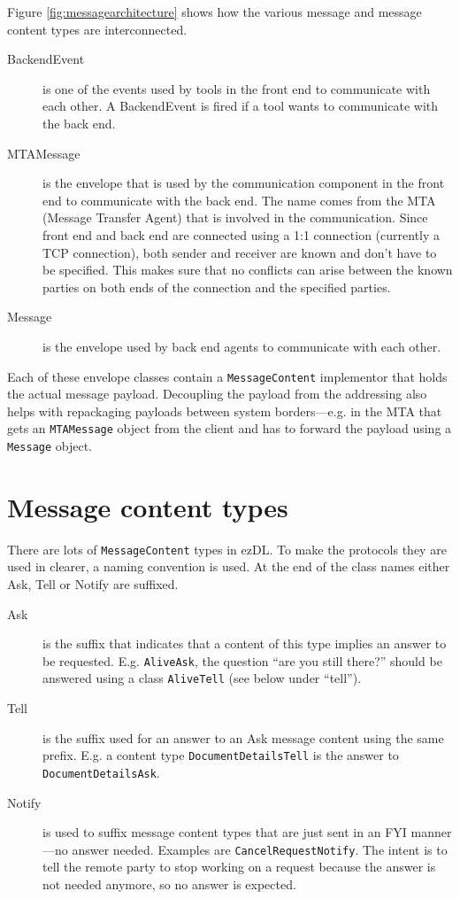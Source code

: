 \documentclass[12pt]{book}
\begin{document}
Figure \ref{fig:messagearchitecture} shows how the various message and message content types are interconnected.

\begin{description}
\item[BackendEvent] is one of the events used by tools in the front end to communicate with each other. A BackendEvent is fired if a tool wants to communicate with the back end.
\item[MTAMessage] is the envelope that is used by the communication component in the front end to communicate with the back end. The name comes from the MTA (Message Transfer Agent) that is involved in the communication. Since front end and back end are connected using a 1:1 connection (currently a TCP connection), both sender and receiver are known and don't have to be specified. This makes sure that no conflicts can arise between the known parties on both ends of the connection and the specified parties.
\item[Message] is the envelope used by back end agents to communicate with each other.
\end{description}

Each of these envelope classes contain a {\tt MessageContent} implementor that holds the actual message payload. Decoupling the payload from the addressing also helps with repackaging payloads between system borders---e.g. in the MTA that gets an {\tt MTAMessage} object from the client and has to forward the payload using a {\tt Message} object.




\section{Message content types}

There are lots of {\tt MessageContent} types in ezDL. To make the protocols they are used in clearer, a naming convention is used. At the end of the class names either Ask, Tell or Notify are suffixed.

\begin{description}
\item[Ask] is the suffix that indicates that a content of this type implies an answer to be requested. E.g. {\tt AliveAsk}, the question ``are you still there?'' should be answered using a class {\tt AliveTell} (see below under ``tell'').
\item[Tell] is the suffix used for an answer to an Ask message content using the same prefix. E.g. a content type {\tt DocumentDetailsTell} is the answer to {\tt DocumentDetailsAsk}.
\item[Notify] is used to suffix message content types that are just sent in an FYI manner---no answer needed. Examples are {\tt CancelRequestNotify}. The intent is to tell the remote party to stop working on a request because the answer is not needed anymore, so no answer is expected.
\end{description}
\end{document}
